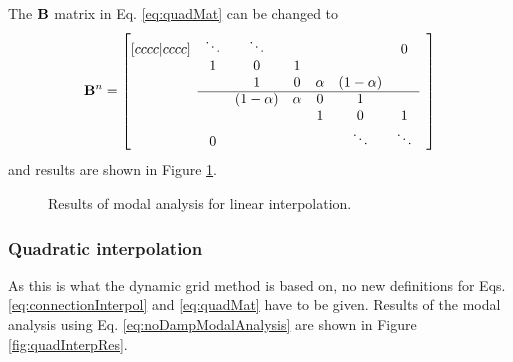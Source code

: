 The $\mathbf{B}$ matrix in Eq. \eqref{eq:quadMat} can be changed to
\begin{equation}
    \B^n = \begin{bmatrix}[cccc|cccc]
     & \ddots  &\ddots & & & & 0 & \\
       & 1 & 0 & 1 & & & & \\
      & & 1 & 0 & \alpha & (1-\alpha) & \\ \cline{2-7}
      & & (1-\alpha) & \alpha &0 & 1 & & \\
         & & & &1 & 0 & 1  \\
         & 0 & &  &  &\ddots & \ddots &
    \end{bmatrix}
\end{equation}
and results are shown in Figure \ref{fig:linInterpRes}.
\begin{figure}[h]
    \centering
    \hfill
    \caption{Results of modal analysis for linear interpolation.}\label{fig:linInterpRes}
\end{figure}

\subsubsection{Quadratic interpolation}
As this is what the dynamic grid method is based on, no new definitions for Eqs. \eqref{eq:connectionInterpol} and \eqref{eq:quadMat} have to be given.
%
%
Results of the modal analysis using Eq. \eqref{eq:noDampModalAnalysis} are shown in Figure \ref{fig:quadInterpRes}.

